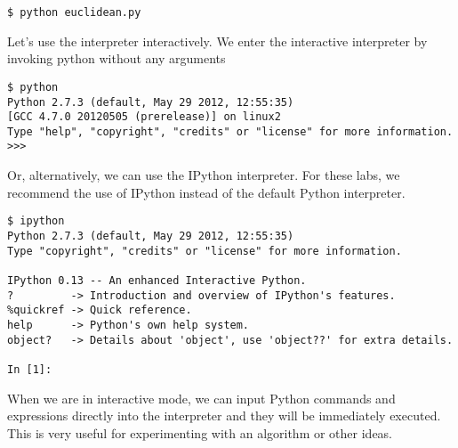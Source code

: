 \begin{lstlisting}
$ python euclidean.py
\end{lstlisting}
Let's use the interpreter interactively. 
We enter the interactive interpreter by invoking python without any arguments
\begin{lstlisting}
$ python
Python 2.7.3 (default, May 29 2012, 12:55:35) 
[GCC 4.7.0 20120505 (prerelease)] on linux2
Type "help", "copyright", "credits" or "license" for more information.
>>> 
\end{lstlisting}
Or, alternatively, we can use the IPython interpreter.  
For these labs, we recommend the use of IPython instead of the default Python interpreter.
\begin{lstlisting}
$ ipython
Python 2.7.3 (default, May 29 2012, 12:55:35) 
Type "copyright", "credits" or "license" for more information.

IPython 0.13 -- An enhanced Interactive Python.
?         -> Introduction and overview of IPython's features.
%quickref -> Quick reference.
help      -> Python's own help system.
object?   -> Details about 'object', use 'object??' for extra details.

In [1]: 
\end{lstlisting}
When we are in interactive mode, we can input Python commands and expressions directly into the interpreter and they will be immediately executed. 
This is very useful for experimenting with an algorithm or other ideas.